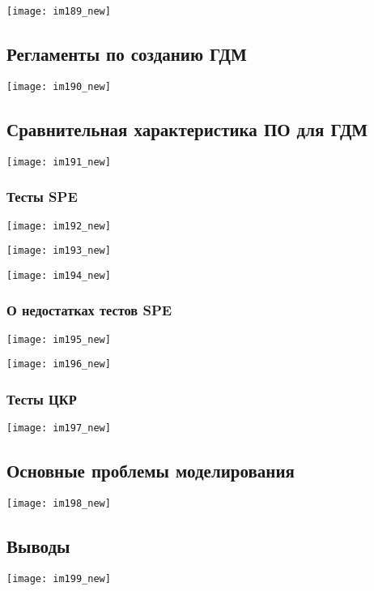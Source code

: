 \documentclass[main.tex]{subfiles}
\begin{document}
\texttt{[image: im189\_new]}

\subsection{Регламенты по созданию ГДМ}

\texttt{[image: im190\_new]}

\subsection{Сравнительная характеристика ПО для ГДМ}

\texttt{[image: im191\_new]}

\subsubsection{Тесты SPE}

\texttt{[image: im192\_new]}

\texttt{[image: im193\_new]}

\texttt{[image: im194\_new]}

\subsubsection{О недостатках тестов SPE}

\texttt{[image: im195\_new]}

\texttt{[image: im196\_new]}

\subsubsection{Тесты ЦКР}

\texttt{[image: im197\_new]}

\subsection{Основные проблемы моделирования}

\texttt{[image: im198\_new]}

\subsection{Выводы}

\texttt{[image: im199\_new]}
\end{document}
